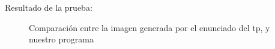 \documentclass [12pt, a4paper]{article}
\begin{document}
	Resultado de la prueba:
	\begin{figure}[h]
		\centering
		\caption{Comparación entre la imagen generada por el enunciado del tp, y nuestro programa}
		\label{f:comparacion2}
	\end{figure}

	\printindex
\end{document}
